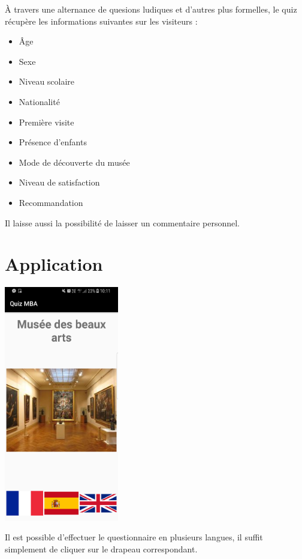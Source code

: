 \documentclass[12]{report}
\begin{document}
  À travers une alternance de quesions ludiques et d'autres plus formelles, le quiz récupère les informations suivantes sur les visiteurs :

  \begin{itemize}
    \item Âge
    \item Sexe
    \item Niveau scolaire
    \item Nationalité
    \item Première visite
    \item Présence d'enfants
    \item Mode de découverte du musée
    \item Niveau de satisfaction
    \item Recommandation \\
  \end{itemize}

  Il laisse aussi la possibilité de laisser un commentaire personnel. \\

  \section{Application}

  \begin{center}
    \includegraphics[width=5cm]{menu.png}
  \end{center}

  Il est possible d'effectuer le questionnaire en plusieurs langues, il suffit simplement de cliquer sur le drapeau correspondant. \\
\end{document}

